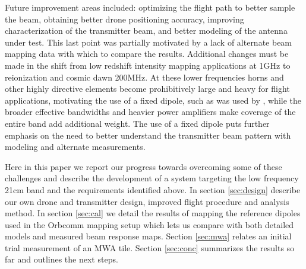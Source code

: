 \documentclass[preprint2,numberedappendix,tighten,twocolappendix]{aastex6}
\begin{document}
Future improvement areas included: optimizing the flight path to better sample the beam, obtaining better drone positioning accuracy, improving characterization of the transmitter beam, and better modeling of the antenna under test. This last point was partially motivated by a lack of alternate beam mapping data with which to compare the results. Additional changes must be made in the shift from low redshift intensity mapping applications at 1GHz to reionization and cosmic dawn 200MHz.  At these lower frequencies horns and other highly directive elements become prohibitively large and heavy for flight applications, motivating the use of a fixed dipole, such as was used by \citet{2014IAWPL..13..169V}, while the broader effective bandwidths and heavier power amplifiers make coverage of the entire band add additional weight. The use of a fixed dipole puts further emphasis on the need to better understand the transmitter beam pattern with modeling and alternate measurements. 


Here in this paper we report our progress towards overcoming some of these challenges and describe the development of a system targeting the low frequency 21cm band and the requirements identified above.  In section \ref{sec:design} describe our own drone and transmitter design, improved flight procedure and analysis method.  In section \ref{sec:cal} we detail the results of mapping the reference dipoles used in the Orbcomm mapping setup which lets us compare with both detailed models and measured beam response maps.  Section \ref{sec:mwa} relates an initial trial measurement of an MWA tile. Section \ref{sec:conc} summarizes the results so far and outlines the next steps.
\end{document}
